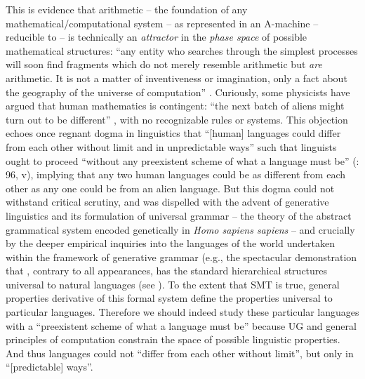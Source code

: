 \documentclass[output=paper]{langsci/langscibook}
\begin{document}
This is evidence that arithmetic – the foundation of any
mathematical/com\-pu\-tational system – as represented in an A-machine – reducible
to  – is technically an \emph{attractor} in the \emph{phase space}
of possible mathematical structures: “any entity who searches through the
simplest processes will soon find fragments which do not merely resemble
arithmetic but \emph{are} arithmetic. It is not a matter of inventiveness or
imagination, only a fact about the geography of the universe of computation”
\citep[122]{Minsky1985}. Curiously, some physicists have argued that human
mathematics is contingent: “the next batch of aliens might turn out to be
different” \citep[774]{HutAlfordTegmark2006}, with no recognizable rules or
systems. This objection echoes once regnant dogma in linguistics that “[human]
languages could differ from each other without limit and in unpredictable ways”
such that linguists ought to proceed “without any preexistent scheme of what a
language must be” (\citealt{Joos1957}: 96, v), implying that any two human
languages could be as different from each other as any one could be from an
alien language. But this dogma could not withstand critical scrutiny, and was
dispelled with the advent of generative linguistics and its formulation of
universal grammar – the theory of the abstract grammatical system encoded
genetically in \emph{Homo sapiens sapiens} – and crucially by the deeper
empirical inquiries into the languages of the world undertaken within the
framework of generative grammar (e.g., the spectacular demonstration that
, contrary to all appearances, has the standard hierarchical
structures universal to natural languages (see \citealt{Hale1976,Legate2001}).
To the extent that \gls{SMT} is true, general
properties derivative of this formal system define the properties universal to
particular languages.  Therefore we should indeed study these particular
languages with a “preexistent scheme of what a language must be” because
\gls{UG} and general principles of computation constrain
the space of possible linguistic properties. And thus languages could not
“differ from each other without limit”, but only in “[predictable] ways”.
\end{document}
